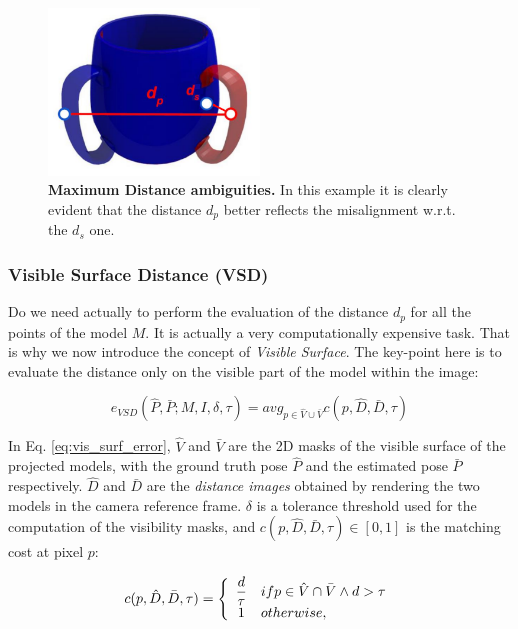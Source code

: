 \begin{figure}
    \centering
    \includegraphics[width=0.5\textwidth]{figures/2_benchmarks_and_metrics/ds_vs_dp}
    \caption{\textbf{Maximum Distance ambiguities.} In this example it is clearly evident that the distance $d_p$ better reflects the misalignment w.r.t. the $d_s$ one.} 
    \label{fig:ds_vs_dp}
\end{figure}

\subsubsection{Visible Surface Distance (VSD)}\label{subsubsec:average_distance}
Do we need actually to perform the evaluation of the distance $d_p$ for all the points of the model $M$. It is actually a very computationally expensive task. That is why we now introduce the concept of \emph{Visible Surface}. The key-point here is to evaluate the distance only on the visible part of the model within the image:

\begin{equation}
    \label{eq:vis_surf_error}
    e_{VSD}(\hat{P}, \bar{P}; M, I, \delta, \tau) = avg_{p \in \hat{V} \cup \bar{V}} c(p, \hat{D}, \bar{D}, \tau)
\end{equation}

In Eq. \ref{eq:vis_surf_error}, $\hat{V}$ and $\bar{V}$ are the 2D masks of the visible surface of the projected models, with the ground truth pose $\hat{P}$ and the estimated pose $\bar{P}$ respectively. $\hat{D}$ and $\bar{D}$ are the \emph{distance images} obtained by rendering the two models in the camera reference frame. $\delta$ is a tolerance threshold used for the computation of the visibility masks, and $c(p, \hat{D}, \bar{D}, \tau) \in [0, 1]$ is the matching cost at pixel $p$:

\begin{equation}
    \label{eq:matching_cost_at_p}
    c(p, \hat{D}, \bar{D}, \tau) = \left\{
\begin{array}{c l}	
     \dfrac{d}{\tau} & if p \in \hat{V} \cap \bar{V} \wedge d > \tau \\
     1 & otherwise,
\end{array}\right.
\end{equation}


